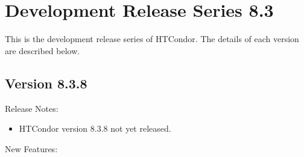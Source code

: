 
\section{\label{sec:History-8-3}Development Release Series 8.3}

This is the development release series of HTCondor.
The details of each version are described below.


\subsection*{\label{sec:New-8-3-8}Version 8.3.8}

\noindent Release Notes:

\begin{itemize}

\item HTCondor version 8.3.8 not yet released.

\end{itemize}


\noindent New Features:

